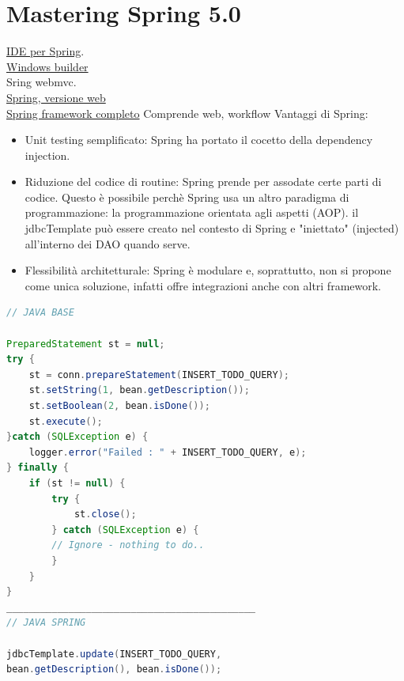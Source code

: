 \documentclass[11pt,a4paper]{book}
\begin{document}
\chapter{Mastering Spring 5.0}\label{par: Spring}
\href{https://spring.io/tools}{IDE per Spring}.\label{web: SpringIDE} \\
\href{https://www.eclipse.org/windowbuilder/}{Windows builder} \\ \label{web: windowsBuilder}
Sring webmvc. \\
\href{https://spring.io/projects/spring-boot}{Spring, versione web} \\ \label{web: Spring Boot}
\href{https://spring.io/projects/spring-framework}{Spring framework completo} Comprende web, workflow \label{web: Spring framework}
Vantaggi di Spring:
\begin{itemize}
	\item Unit testing semplificato: Spring ha portato il cocetto della dependency injection.
	\item Riduzione del codice di routine: Spring prende per assodate certe parti di codice. Questo è possibile perchè Spring usa un altro paradigma di programmazione: la programmazione orientata agli aspetti (AOP). il jdbcTemplate può essere creato nel contesto di Spring e "iniettato" (injected) all'interno dei DAO quando serve.
	\item Flessibilità architetturale: Spring è modulare e, soprattutto, non si propone come unica soluzione, infatti offre integrazioni anche con altri framework.
\end{itemize}
\begin{lstlisting}[language = Java]
// JAVA BASE

PreparedStatement st = null;
try {
	st = conn.prepareStatement(INSERT_TODO_QUERY);
	st.setString(1, bean.getDescription());
	st.setBoolean(2, bean.isDone());
	st.execute();
}catch (SQLException e) {
	logger.error("Failed : " + INSERT_TODO_QUERY, e);
} finally {
	if (st != null) {
		try {
			st.close();
		} catch (SQLException e) {
		// Ignore - nothing to do..
		}
	}
}
____________________________________________
// JAVA SPRING

jdbcTemplate.update(INSERT_TODO_QUERY,
bean.getDescription(), bean.isDone());
\end{lstlisting}
\end{document}
